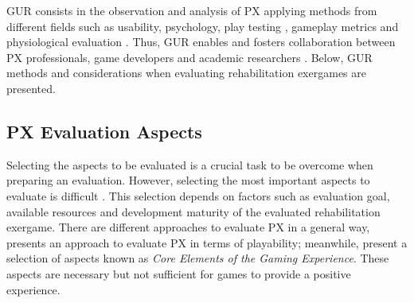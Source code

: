 \ac{GUR} consists in the observation and analysis of \ac{PX} applying methods from different fields such as usability, psychology, play testing \autocite{Wiemeyer2016}, gameplay metrics \autocite{Drachen2013} and physiological evaluation \autocite{Nacke2015}. Thus, \ac{GUR} enables and fosters collaboration between \ac{PX} professionals, game developers and academic researchers \autocite{desurvire_methods_2013}. Below, \ac{GUR} methods and considerations when evaluating rehabilitation exergames are presented.


\subsection{\ac{PX} Evaluation Aspects}
\label{subsec:aspects}

Selecting the aspects to be evaluated is a crucial task to be overcome when preparing an evaluation. However, selecting the most important aspects to evaluate is difficult \autocite{Nacked}. This selection depends on factors such as evaluation goal, available resources and development maturity of the evaluated rehabilitation exergame. There are different approaches to evaluate \ac{PX} in a general way, \textcite{Sanchez2009} presents an approach to evaluate \ac{PX} in terms of playability; meanwhile, \textcite{Calvillo-Gamez2015} present a selection of aspects known as \emph{Core Elements of the Gaming Experience}. These aspects are necessary but not sufficient for games to provide a positive experience.

